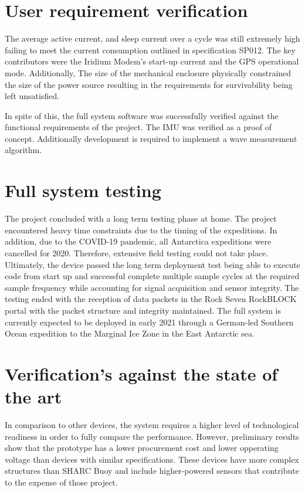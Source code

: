 \section{User requirement verification}
The average active current, and sleep current over a cycle was still extremely high failing to meet the current consumption outlined in specification SP012. The key contributors were the Iridium Modem's start-up current and the GPS operational mode. Additionally, The size of the mechanical enclosure physically constrained the size of the power source resulting in the requirements for survivability being left unsatisfied.\par 

In spite of this, the full system software was successfully verified against the functional requirements of the project. The IMU was verified as a proof of concept. Additionally development is required to implement  a wave measurement algorithm.

\section{Full system testing}

The project concluded with a long term testing phase at home. The project encountered heavy time constraints due to the timing of the expeditions. In addition, due to the COVID-19 pandemic, all Antarctica expeditions were cancelled for 2020. Therefore, extensive field testing could not take place. Ultimately, the device passed the long term deployment test being able to execute code from start up and successful complete multiple sample cycles at the required sample frequency while accounting for signal acquisition and sensor integrity. The testing ended with the reception of data packets in the Rock Seven RockBLOCK portal with the packet structure and integrity maintained. The full system is currently expected to be deployed in early 2021 through a German-led Southern Ocean expedition to the Marginal Ice Zone in the East Antarctic sea.

\section{Verification's against the state of the art}

In comparison to other devices, the system requires a higher level of technological readiness in order to fully compare the performance. However, preliminary results show that the prototype has a lower procurement cost and lower opperating voltage than devices with similar specifications. These devices have more complex structures than SHARC Buoy and include higher-powered sensors that contribute to the expense of those project.


